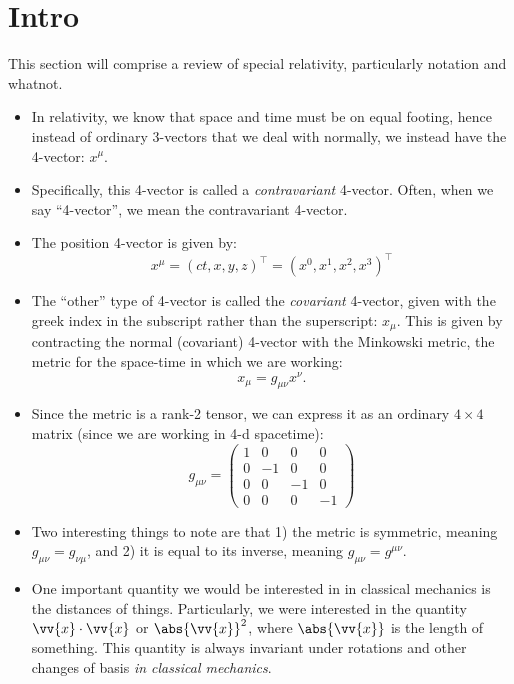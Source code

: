 \section{Intro}
This section will comprise a review of special relativity, particularly notation and whatnot.


\begin{itemize}
    \item In relativity, we know that space and time must be on equal footing, hence instead of ordinary 3-vectors that we deal with normally, we instead have the 4-vector: $x^{\mu}$. 
    \item Specifically, this 4-vector is called a \textit{contravariant} 4-vector. Often, when we say ``4-vector'', we mean the contravariant 4-vector.
    \item The position 4-vector is given by:
        \begin{equation}
            x^{\mu} = (ct, x, y, z)^{\intercal} = (x^0, x^1, x^2, x^3)^{\intercal}
        \end{equation}
    \item The ``other'' type of 4-vector is called the \textit{covariant} 4-vector, given with the greek index in the subscript rather than the superscript: $x_{\mu}$. This is given by contracting the normal (covariant) 4-vector with the Minkowski metric, the metric for the space-time in which we are working:
        \begin{equation}
            x_{\mu} = g_{\mu\nu}x^{\nu}.
        \end{equation}
    \item Since the metric is a rank-2 tensor, we can express it as an ordinary $4\times4$ matrix (since we are working in 4-d spacetime):
        \begin{equation}
            g_{\mu\nu} = 
            \begin{pmatrix}
                1 & 0 & 0 & 0 \\
                0 & -1 & 0 & 0 \\
                0 & 0 & -1 & 0 \\
                0 & 0 & 0 & -1
            \end{pmatrix}
        \end{equation}
    \item Two interesting things to note are that 1) the metric is symmetric, meaning $g_{\mu\nu} = g_{\nu\mu}$, and 2) it is equal to its inverse, meaning $g_{\mu\nu} = g^{\mu\nu}$. 
    \item One important quantity we would be interested in in classical mechanics is the distances of things. Particularly, we were interested in the quantity $\vv{x} \cdot \vv{x}$ or $\abs{\vv{x}}^2$, where $\abs{\vv{x}}$ is the length of something. This quantity is always invariant under rotations and other changes of basis \textit{in classical mechanics}.

\end{itemize}
